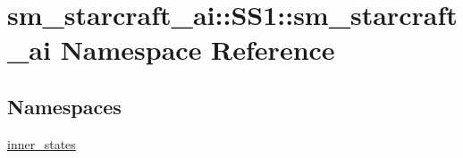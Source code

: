 \hypertarget{namespacesm__starcraft__ai_1_1SS1_1_1sm__starcraft__ai}{}\section{sm\+\_\+starcraft\+\_\+ai\+:\+:S\+S1\+:\+:sm\+\_\+starcraft\+\_\+ai Namespace Reference}
\label{namespacesm__starcraft__ai_1_1SS1_1_1sm__starcraft__ai}
\subsection*{Namespaces}
\begin{DoxyCompactItemize}
\item 
 \hyperlink{namespacesm__starcraft__ai_1_1SS1_1_1sm__starcraft__ai_1_1inner__states}{inner\+\_\+states}
\end{DoxyCompactItemize}
